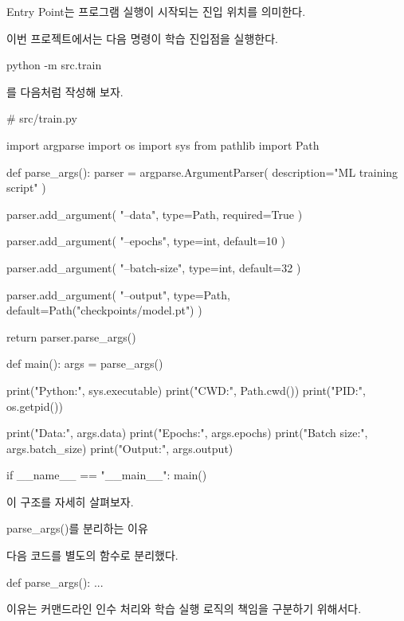 Entry Point는 프로그램 실행이 시작되는 진입 위치를 의미한다.

이번 프로젝트에서는 다음 명령이 학습 진입점을 실행한다.

\begin{dhkzsh}
python -m src.train
\end{dhkzsh}

를 다음처럼 작성해 보자.

\begin{dhkcode}
# src/train.py

import argparse
import os
import sys
from pathlib import Path


def parse_args():
    parser = argparse.ArgumentParser(
        description="ML training script"
    )

    parser.add_argument(
        "--data",
        type=Path,
        required=True
    )

    parser.add_argument(
        "--epochs",
        type=int,
        default=10
    )

    parser.add_argument(
        "--batch-size",
        type=int,
        default=32
    )

    parser.add_argument(
        "--output",
        type=Path,
        default=Path("checkpoints/model.pt")
    )

    return parser.parse_args()


def main():
    args = parse_args()

    print("Python:", sys.executable)
    print("CWD:", Path.cwd())
    print("PID:", os.getpid())

    print("Data:", args.data)
    print("Epochs:", args.epochs)
    print("Batch size:", args.batch_size)
    print("Output:", args.output)


if __name__ == "__main__":
    main()
\end{dhkcode}

이 구조를 자세히 살펴보자.

\begin{dhknote}
\begin{dhksmry}[centered]
parse_args()를 분리하는 이유
\end{dhksmry}
\end{dhknote}

다음 코드를 별도의 함수로 분리했다.

\begin{dhkcode}
def parse_args():
    ...
\end{dhkcode}

이유는 커맨드라인 인수 처리와 학습 실행 로직의 책임을 구분하기 위해서다.


